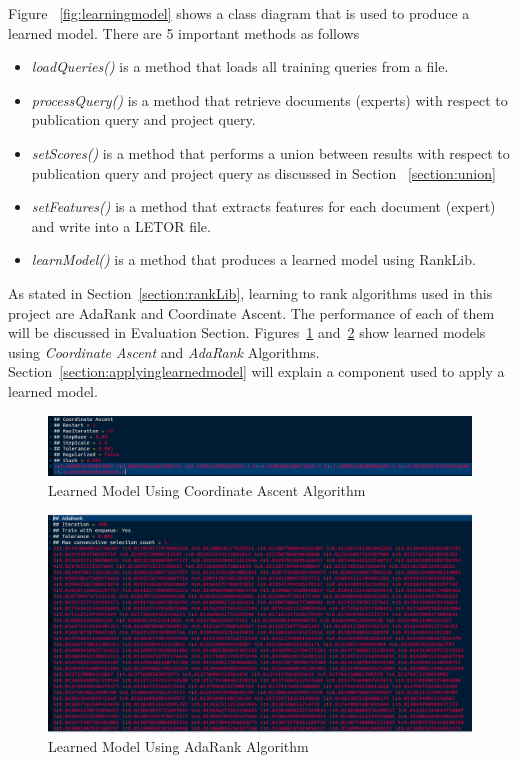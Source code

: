 Figure ~\ref{fig:learningmodel} shows a class diagram that is used to produce a learned model. There are 5 important methods as follows
\begin{itemize}
 \item \textit{loadQueries()} is a method that loads all training queries from a file.
 \item \textit{processQuery()} is a method that retrieve documents (experts) with respect to publication query and project query.
 \item \textit{setScores()} is a method that performs a union between results with respect to publication query and project query as discussed in Section ~\ref{section:union}
 \item \textit{setFeatures()} is a method that extracts features for each document (expert) and write into a LETOR file.
 \item \textit{learnModel()} is a method that produces a learned model using RankLib.
\end{itemize}

As stated in Section~\ref{section:rankLib}, learning to rank algorithms used in this project are AdaRank and Coordinate Ascent. The performance of each
of them will be discussed in Evaluation Section. Figures~\ref{fig:samplemodel} and~\ref{fig:adarankModel} show learned models 
using \textit{Coordinate Ascent} and \textit{AdaRank} Algorithms.
Section~\ref{section:applyinglearnedmodel} will explain a component used to apply a learned model.

\begin{figure}
\centering
\includegraphics[scale=0.3]{./figures/samplemodel.png}
\caption{Learned Model Using Coordinate Ascent Algorithm} \label{fig:samplemodel} 
\end{figure}

\begin{figure}
\centering
\includegraphics[scale=0.3]{./figures/adarankModel.png}
\caption{Learned Model Using AdaRank Algorithm} \label{fig:adarankModel} 
\end{figure}


